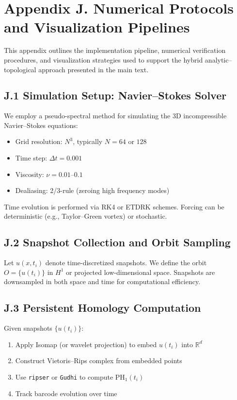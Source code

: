 \documentclass[11pt]{article}
\theoremstyle{definition}
\begin{document}

\section*{Appendix J. Numerical Protocols and Visualization Pipelines}

This appendix outlines the implementation pipeline, numerical verification procedures, and visualization strategies used to support the hybrid analytic–topological approach presented in the main text.

\subsection*{J.1 Simulation Setup: Navier--Stokes Solver}
We employ a pseudo-spectral method for simulating the 3D incompressible Navier--Stokes equations:
\begin{itemize}
  \item Grid resolution: $N^3$, typically $N = 64$ or $128$
  \item Time step: $\Delta t = 0.001$
  \item Viscosity: $\nu = 0.01$--$0.1$
  \item Dealiasing: 2/3-rule (zeroing high frequency modes)
\end{itemize}
Time evolution is performed via RK4 or ETDRK schemes. Forcing can be deterministic (e.g., Taylor--Green vortex) or stochastic.

\subsection*{J.2 Snapshot Collection and Orbit Sampling}
Let $u(x,t_i)$ denote time-discretized snapshots. We define the orbit $O = \{u(t_i)\}$ in $H^1$ or projected low-dimensional space. Snapshots are downsampled in both space and time for computational efficiency.

\subsection*{J.3 Persistent Homology Computation}
Given snapshots $\{u(t_i)\}$:
\begin{enumerate}
  \item Apply Isomap (or wavelet projection) to embed $u(t_i)$ into $\mathbb{R}^d$
  \item Construct Vietoris--Rips complex from embedded points
  \item Use \texttt{ripser} or \texttt{Gudhi} to compute $\mathrm{PH}_1(t_i)$
  \item Track barcode evolution over time
\end{enumerate}
\end{document}
